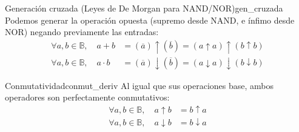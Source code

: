 \begin{teorema}{Generación cruzada (Leyes de De Morgan para NAND/NOR)}{gen_cruzada}
Podemos generar la operación opuesta (supremo desde NAND, e ínfimo desde NOR) negando previamente las entradas:
\begin{align*}
    \forall a, b \in \mathbb{B}, \quad a + b &= (\overline{a}) \uparrow (\overline{b}) = (a \uparrow a) \uparrow (b \uparrow b) \\
    \forall a, b \in \mathbb{B}, \quad a \cdot b &= (\overline{a}) \downarrow (\overline{b}) = (a \downarrow a) \downarrow (b \downarrow b)
\end{align*}
\end{teorema}

\begin{teorema}{Conmutatividad}{conmut_deriv}
Al igual que sus operaciones base, ambos operadores son perfectamente conmutativos:
\begin{align*}
    \forall a, b \in \mathbb{B}, \quad a \uparrow b &= b \uparrow a \\
    \forall a, b \in \mathbb{B}, \quad a \downarrow b &= b \downarrow a
\end{align*}
\end{teorema}


